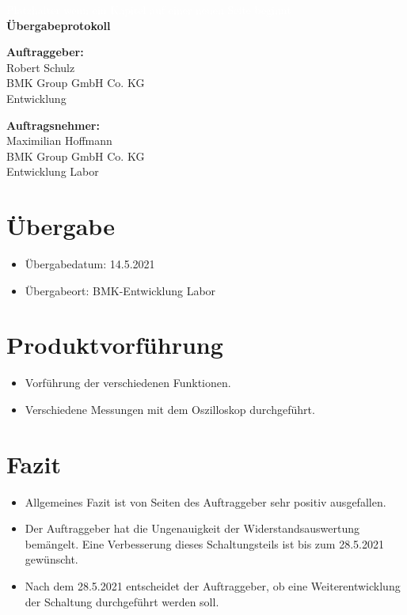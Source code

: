 \documentclass[a4paper,11pt]{scrartcl}
\begin{document}
\begin{center}
	\begin{huge}
	\textcolor{white}{\tiny{Platzhalter wenn ein Kapitel auf einer neuen Seite beginnt\\}}
	\textbf{Übergabeprotokoll}
	\end{huge}
\end{center}

\textbf{Auftraggeber:}\\
Robert Schulz\\
BMK Group GmbH Co. KG\\
Entwicklung \\

\vspace{0,5cm}

\textbf{Auftragsnehmer:}\\
Maximilian Hoffmann\\
BMK Group GmbH Co. KG\\
Entwicklung Labor

\section{Übergabe}

\begin{itemize}
	\item{Übergabedatum: 14.5.2021}
	
	\item{Übergabeort: BMK-Entwicklung Labor}
\end{itemize}

\section{Produktvorführung}

\begin{itemize}
	\item{Vorführung der verschiedenen Funktionen.}
	
	\item{Verschiedene Messungen mit dem Oszilloskop durchgeführt.}
\end{itemize}

\section{Fazit}

\begin{itemize}
	\item{Allgemeines Fazit ist von Seiten des Auftraggeber sehr positiv ausgefallen.}
	
	\item{Der Auftraggeber hat die Ungenauigkeit der Widerstandsauswertung bemängelt. Eine Verbesserung dieses Schaltungsteils ist bis zum 28.5.2021 gewünscht.}
	
	\item{Nach dem 28.5.2021 entscheidet der Auftraggeber, ob eine Weiterentwicklung der Schaltung durchgeführt werden soll.}
\end{itemize}
\end{document}
